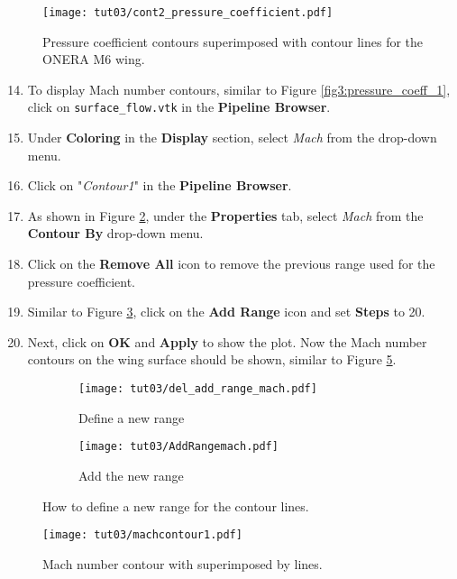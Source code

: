 \begin{figure}[ht]
    \centering
    \texttt{[image: tut03/cont2\_pressure\_coefficient.pdf]}
    \caption{Pressure coefficient contours superimposed with contour lines for the ONERA M6 wing.}
    \label{fig3:pressure_contour_lines}
\end{figure}
\begin{enumerate}[label=\arabic*)]
	\setcounter{enumi}{13}
	\item To display Mach number contours, similar to Figure \ref{fig3:pressure_coeff_1}, click on \texttt{surface\_flow.vtk} in the \textbf{Pipeline Browser}.
	\item Under \textbf{Coloring} in the \textbf{Display} section, select \textit{Mach} from the drop-down menu.
	\item Click on "\textit{Contour1}" in the \textbf{Pipeline Browser}.
	\item As shown in Figure \ref{fig3:contourby2 a}, under the \textbf{Properties} tab, select \textit{Mach} from the \textbf{Contour By} drop-down menu.
	\item Click on the \textbf{Remove All} icon to remove the previous range used for the pressure coefficient.
	\item Similar to Figure \ref{fig3:contourby2 b}, click on the \textbf{Add Range} icon and set \textbf{Steps} to 20.
	\item Next, click on \textbf{OK} and \textbf{Apply} to show the plot. Now the Mach number contours on the wing surface should be shown, similar to Figure \ref{fig3:mach_contour}.
\end{enumerate}    
\begin{figure}[ht]
    \centering
     \begin{subfigure}[b]{.4\textwidth}
         \centering
         \texttt{[image: tut03/del\_add\_range\_mach.pdf]}
         \caption{Define a new range}
         \label{fig3:contourby2 a}
     \end{subfigure}
     \hfill
     \begin{subfigure}[b]{.4\textwidth}
         \centering
         \texttt{[image: tut03/AddRangemach.pdf]}
         \caption{Add the new range}
         \label{fig3:contourby2 b}
     \end{subfigure}     
    \caption{How to define a new range for the contour lines.}
    \label{fig3:contourby2}
\end{figure}
\begin{figure}[ht]
    \centering
    \texttt{[image: tut03/machcontour1.pdf]}
    \caption{Mach number contour with superimposed by lines.}
    \label{fig3:mach_contour}
\end{figure}
